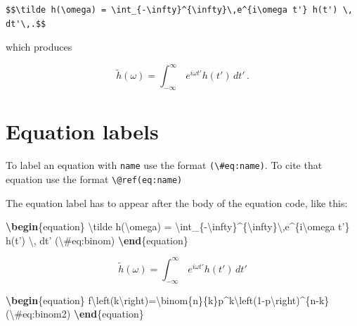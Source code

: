 \documentclass[]{book}
\newenvironment{Shaded}{\begin{snugshade}}{\end{snugshade}}
\newcommand{\ExtensionTok}[1]{#1}
\newcommand{\KeywordTok}[1]{\textcolor[rgb]{0.13,0.29,0.53}{\textbf{#1}}}
\newcommand{\NormalTok}[1]{#1}
\newcommand{\SpecialCharTok}[1]{\textcolor[rgb]{0.00,0.00,0.00}{#1}}
\newcommand{\SpecialStringTok}[1]{\textcolor[rgb]{0.31,0.60,0.02}{#1}}
\begin{document}
\begin{verbatim}
$$\tilde h(\omega) = \int_{-\infty}^{\infty}\,e^{i\omega t'} h(t') \, dt'\,.$$
\end{verbatim}

which produces

\[\tilde h(\omega) = \int_{-\infty}^{\infty}\,e^{i\omega t'} h(t') \, dt'\,.\]

\hypertarget{equation-labels}{%
\section{Equation labels}\label{equation-labels}}

To label an equation with \texttt{name} use the format \texttt{(\textbackslash{}\#eq:name)}.
To cite that equation use the format \texttt{\textbackslash{}@ref(eq:name)}

The equation label has to appear after the body of the equation code, like this:

\begin{Shaded}
\begin{Highlighting}[]
\KeywordTok{\textbackslash{}begin}\NormalTok{\{}\ExtensionTok{equation}\NormalTok{\}}\SpecialStringTok{ }
\SpecialStringTok{  }\SpecialCharTok{\textbackslash{}tilde}\SpecialStringTok{ h(}\SpecialCharTok{\textbackslash{}omega}\SpecialStringTok{) = }\SpecialCharTok{\textbackslash{}int}\SpecialStringTok{_\{-}\SpecialCharTok{\textbackslash{}infty}\SpecialStringTok{\}^\{}\SpecialCharTok{\textbackslash{}infty}\SpecialStringTok{\}}\SpecialCharTok{\textbackslash{},}\SpecialStringTok{e^\{i}\SpecialCharTok{\textbackslash{}omega}\SpecialStringTok{ t'\} h(t') }\SpecialCharTok{\textbackslash{},}\SpecialStringTok{ dt'}
\SpecialStringTok{  (}\SpecialCharTok{\textbackslash{}#}\SpecialStringTok{eq:binom)}
\KeywordTok{\textbackslash{}end}\NormalTok{\{}\ExtensionTok{equation}\NormalTok{\} }
\end{Highlighting}
\end{Shaded}

\begin{equation}
  \tilde h(\omega) = \int_{-\infty}^{\infty}\,e^{i\omega t'} h(t') \, dt'
  \label{eq:binom}
\end{equation}

\begin{Shaded}
\begin{Highlighting}[]
\KeywordTok{\textbackslash{}begin}\NormalTok{\{}\ExtensionTok{equation}\NormalTok{\}}
\SpecialStringTok{f}\SpecialCharTok{\textbackslash{}left}\SpecialStringTok{(k}\SpecialCharTok{\textbackslash{}right}\SpecialStringTok{)=}\SpecialCharTok{\textbackslash{}binom}\SpecialStringTok{\{n\}\{k\}p^k}\SpecialCharTok{\textbackslash{}left}\SpecialStringTok{(1-p}\SpecialCharTok{\textbackslash{}right}\SpecialStringTok{)^\{n-k\} (}\SpecialCharTok{\textbackslash{}#}\SpecialStringTok{eq:binom2)}
\KeywordTok{\textbackslash{}end}\NormalTok{\{}\ExtensionTok{equation}\NormalTok{\}}
\end{Highlighting}
\end{Shaded}
\end{document}
